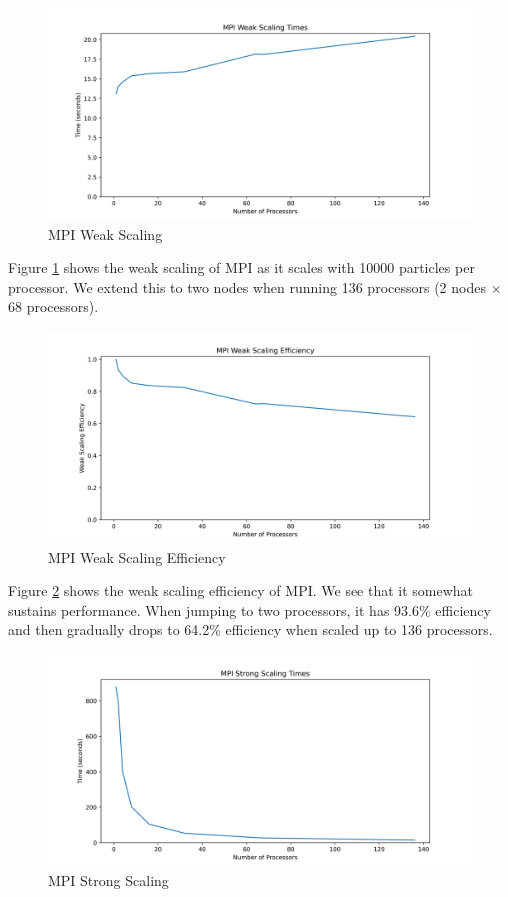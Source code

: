 \documentclass{article}
\begin{document}
\begin{figure}[H]
\centering
\includegraphics[width=6in]{figures/mpi_weak_scaling_times.png}
\caption{MPI Weak Scaling}
\label{fig:mpi-weak-scaling}
\end{figure}

Figure \ref{fig:mpi-weak-scaling} shows the weak scaling of MPI as it scales with 10000 particles per processor. We extend this to two nodes when running 136 processors (2 nodes $\times$ 68 processors).

\begin{figure}[H]
\centering
\includegraphics[width=6in]{figures/mpi_weak_scaling_efficiency.png}
\caption{MPI Weak Scaling Efficiency}
\label{fig:mpi-weak-scaling-efficiency}
\end{figure}

Figure \ref{fig:mpi-weak-scaling-efficiency} shows the weak scaling efficiency of MPI. We see that it somewhat sustains performance. When jumping to two processors, it has 93.6\% efficiency and then gradually drops to 64.2\% efficiency when scaled up to 136 processors.

\begin{figure}[H]
\centering
\includegraphics[width=6in]{figures/mpi_strong_scaling_times.png}
\caption{MPI Strong Scaling}
\label{fig:mpi-strong-scaling}
\end{figure}
\end{document}
